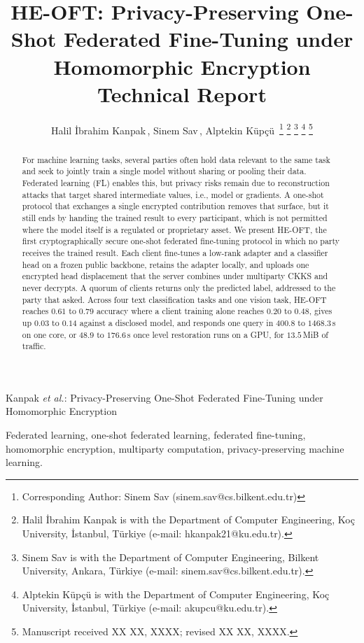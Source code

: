 \title{HE-OFT: Privacy-Preserving One-Shot Federated Fine-Tuning under Homomorphic Encryption\ifsubmission\else\\[2pt]\large Technical Report\fi}

\author{
Halil \.{I}brahim Kanpak\,,
Sinem Sav\,,
Alptekin K\"up\c{c}\"u\,%
\thanks{Corresponding Author: Sinem Sav (sinem.sav@cs.bilkent.edu.tr)}%
\thanks{Halil \.{I}brahim Kanpak is with the Department of Computer Engineering, Ko\c{c} University, İstanbul, Türkiye (e-mail: hkanpak21@ku.edu.tr).}%
\thanks{Sinem Sav is with the Department of Computer Engineering, Bilkent University, Ankara, Türkiye (e-mail: sinem.sav@cs.bilkent.edu.tr).}%
\thanks{Alptekin K\"up\c{c}\"u is with the Department of Computer Engineering, Ko\c{c} University, İstanbul, Türkiye (e-mail: akupcu@ku.edu.tr).}%
\thanks{Manuscript received XX XX, XXXX; revised XX XX, XXXX.}%
}

%
{Kanpak \MakeLowercase{\textit{et al.}}: Privacy-Preserving One-Shot Federated Fine-Tuning under Homomorphic Encryption}

\maketitle

\begin{abstract}
For machine learning tasks, several parties often hold data relevant to the same task and seek to jointly train a single model without sharing or pooling their data.
Federated learning (FL) enables this, but privacy risks remain due to reconstruction attacks that target shared intermediate values, i.e., model or gradients. 
A one-shot protocol that exchanges a single encrypted contribution removes that surface,
but it still ends by handing the trained result to every participant, which is not
permitted where the model itself is a regulated or proprietary asset. We present HE-OFT, the first cryptographically secure one-shot federated fine-tuning protocol in which no
party receives the trained result. Each client fine-tunes a low-rank adapter and a classifier head on a frozen public backbone, retains the adapter locally, and uploads one encrypted
head displacement that the server combines under multiparty CKKS and never
decrypts. A quorum of clients returns only the predicted label, addressed to the party that asked. Across four text classification tasks and one vision task, HE-OFT reaches $0.61$ to $0.79$ accuracy where a client training alone reaches $0.20$ to $0.48$, gives up $0.03$ to $0.14$ against a disclosed model, and responds one query in $400.8$ to $1468.3$\,s on one core, or $48.9$ to $176.6$\,s once level restoration runs on a GPU, for $13.5$\,MiB of traffic.
\end{abstract}

\begin{IEEEkeywords}
Federated learning, one-shot federated learning, federated fine-tuning, homomorphic encryption,
multiparty computation, privacy-preserving machine learning.
\end{IEEEkeywords}
